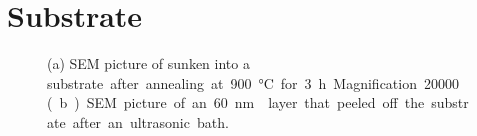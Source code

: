 \section{\Ir Substrate}\label{sec::ir_substrate}


\begin{figure}[tp]
	\begin{subfigure}[t]{ 0.49\linewidth}
		\caption{}\label{subfig::sunken_nd}
		\centering
	\end{subfigure}
	\hfill
	\begin{subfigure}[t]{ 0.49\linewidth}
		\caption{}\label{subfig::peeled_ir}
		\centering
	\end{subfigure}
	\caption{(a) SEM picture of \nds sunken into a \si substrate after annealing at \SI{900}{\celsius} for \SI{3}{h}. Magnification \num{20000} (b) SEM picture of an \SI{60}{nm} \ir layer that peeled off the substrate after an ultrasonic bath.}
	\label{fig::sem_substrates}
\end{figure}


